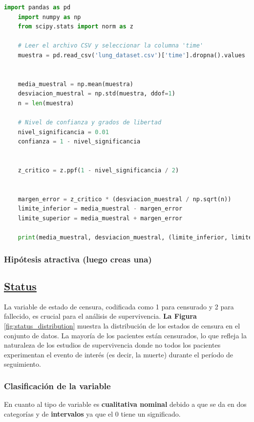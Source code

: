 \documentclass[a4paper,12pt]{article}
\begin{document}
\begin{lstlisting}[language=Python, caption={Código en Python para calcular el intervalo de confianza},label={lst:intervalo_confianza_normal}]
    import pandas as pd
    import numpy as np
    from scipy.stats import norm as z
    
    # Leer el archivo CSV y seleccionar la columna 'time'
    muestra = pd.read_csv('lung_dataset.csv')['time'].dropna().values
    
    
    media_muestral = np.mean(muestra)
    desviacion_muestral = np.std(muestra, ddof=1)
    n = len(muestra)
    
    # Nivel de confianza y grados de libertad
    nivel_significancia = 0.01
    confianza = 1 - nivel_significancia
    

    z_critico = z.ppf(1 - nivel_significancia / 2)
    
    
    margen_error = z_critico * (desviacion_muestral / np.sqrt(n))
    limite_inferior = media_muestral - margen_error
    limite_superior = media_muestral + margen_error
    
    print(media_muestral, desviacion_muestral, (limite_inferior, limite_superior))
    \end{lstlisting}


    \subsubsection*{Hipótesis atractiva (luego creas una)}

    \subsection*{\underline{Status}}

    La variable de estado de censura, codificada como 1 para censurado y 2 para fallecido, es crucial para el análisis de supervivencia. \textbf{La Figura }\ref{fig:status_distribution} muestra la distribución de los estados de censura en el conjunto de datos. La mayoría de los pacientes están censurados, lo que refleja la naturaleza de los estudios de supervivencia donde no todos los pacientes experimentan el evento de interés (es decir, la muerte) durante el período de seguimiento. 
    
    \subsubsection*{Clasificación de la variable}

    En cuanto al tipo de variable es \textbf{cualitativa nominal} debido a que se da en dos categorías y de \textbf{intervalos} ya que el 0 tiene un significado.
\end{document}
